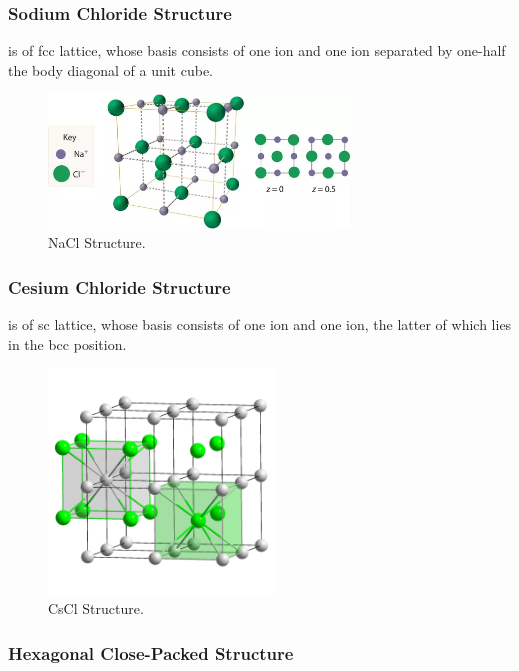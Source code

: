 \documentclass[hidelinks]{article}
\begin{document}
\subsubsection{Sodium Chloride Structure} %
\label{ssub:sodium_chloride_structure}

 is of fcc lattice, whose basis consists of one  ion and one  ion separated by one-half the body diagonal of a unit cube.

\begin{figure}[ht]
    \centering
    \includegraphics[width=8cm]{src/NaCl.png}
    \caption{NaCl Structure.}
\end{figure}


\subsubsection{Cesium Chloride Structure} %
\label{ssub:cesium_chloride_structure}

 is of sc lattice, whose basis consists of one  ion and one  ion, the latter of which lies in the bcc position.

\begin{figure}[ht]
    \centering
    \includegraphics[width=6cm]{src/CsCl.png}
    \caption{CsCl Structure.}
\end{figure}


\subsubsection{Hexagonal Close-Packed Structure} %
\label{ssub:hexagonal_close_packed_structure}
\end{document}
